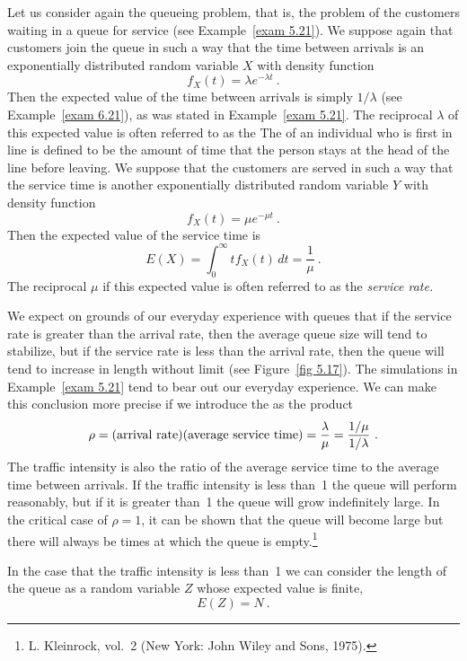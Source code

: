 {\begin{example}\label{exam 6.24} Let us consider again the queueing problem, that is,
the problem of the customers waiting in a queue for service (see Example~\ref{exam
5.21}).  We suppose again that customers join the queue in such a way that the time
between arrivals is an exponentially distributed random variable $X$ with density
function
$$ f_X(t) = \lambda e^{-\lambda t}\ .
$$ Then the expected value of the time between arrivals is simply $1/\lambda$ (see
Example~\ref{exam 6.21}), as was stated in Example~\ref{exam 5.21}.  The reciprocal
$\lambda$ of this expected value is often referred to as the    The
 of an individual who is first in line is defined to be the amount
of time that the person stays at the head of the line before leaving.  We suppose that
the customers are served in such a way that the service time is another exponentially
distributed random variable
$Y$ with density function
$$ f_X(t) = \mu e^{-\mu t}\ .
$$ Then the expected value of the service time is
$$ E(X) = \int_0^\infty t f_X(t)\, dt = \frac 1\mu\ .
$$ The reciprocal $\mu$ if this expected value is often referred to as the {\em
service rate.}
\par We expect on grounds of our everyday experience with queues that if the service
rate is greater than the arrival rate, then the average queue size will tend to
stabilize, but if the service rate is less than the arrival rate, then the queue will
tend to increase in length without limit (see Figure~\ref{fig 5.17}).  The simulations
in Example~\ref{exam 5.21} tend to bear out our everyday experience.  We can make this
conclusion more precise if we introduce the   as the product
$$
\rho = ({\rm arrival\ rate})({\rm average\ service\ time}) = \frac \lambda\mu =
\frac {1/\mu}{1/\lambda}\ .
$$ The traffic intensity is also the ratio of the average service time to the average
time between arrivals.  If the traffic intensity is less than~1 the queue will
perform reasonably, but if it is greater than~1 the queue will grow indefinitely
large.  In the critical case of $\rho = 1$, it can be shown that the queue will
become large but there will always be times at which the queue is empty.\footnote{L.
Kleinrock,   vol.~2 (New York: John Wiley and Sons, 1975).}

In the case that the traffic intensity is less than~1 we can consider the length of
the queue as a random variable $Z$ whose expected value is finite,
$$ E(Z) = N\ .
$$


\end{example}}
